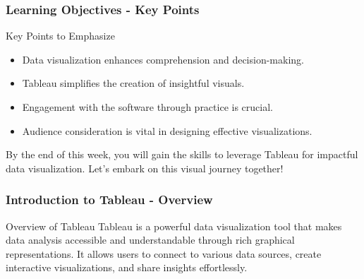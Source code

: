 \documentclass[aspectratio=169]{beamer}
\begin{document}
\begin{frame}[fragile]
    \frametitle{Learning Objectives - Key Points}
    \begin{block}{Key Points to Emphasize}
        \begin{itemize}
            \item Data visualization enhances comprehension and decision-making.
            \item Tableau simplifies the creation of insightful visuals.
            \item Engagement with the software through practice is crucial.
            \item Audience consideration is vital in designing effective visualizations.
        \end{itemize}
    \end{block}
    By the end of this week, you will gain the skills to leverage Tableau for impactful data visualization. Let's embark on this visual journey together!
\end{frame}

\begin{frame}[fragile]
    \frametitle{Introduction to Tableau - Overview}
    \begin{block}{Overview of Tableau}
        Tableau is a powerful data visualization tool that makes data analysis accessible and understandable through rich graphical representations. It allows users to connect to various data sources, create interactive visualizations, and share insights effortlessly.
    \end{block}
\end{frame}
\end{document}

